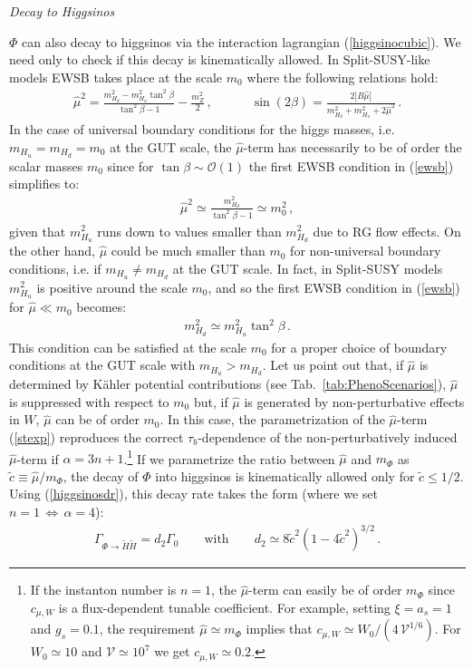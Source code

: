 \documentclass[12pt,a4paper]{book}
\newcommand\vo{{\mathcal{V}}}
\begin{document}
\textit{Decay to Higgsinos}

$\Phi$ can also decay to higgsinos via the interaction lagrangian (\ref{higgsinocubic}). We need only to check if this decay is kinematically allowed. In Split-SUSY-like models EWSB takes place at the scale $m_0$ where the following relations hold:
\begin{align}
\hat\mu^2 = \frac{m_{H_d}^2 - m_{H_u}^2 \tan^2 \beta}{\tan^2 \beta - 1} - \frac{m_Z^2}{2}\,, \qquad \quad \sin\left(2 \beta\right) = \frac{2 |B \hat\mu|}{m_{H_d}^2 + m_{H_u}^2 + 2 \hat\mu^2}\,.
\label{ewsb}
\end{align}
In the case of universal boundary conditions for the higgs masses, i.e. $m_{H_u}=m_{H_d}=m_0$ at the GUT scale, the $\hat\mu$-term has necessarily to be of order the scalar masses $m_0$ since for $\tan \beta \sim \mathcal{O}\left(1\right)$ the first EWSB condition in (\ref{ewsb}) simplifies to:
\begin{align}
\hat\mu^2 \simeq \frac{m_{H_d}^2}{\tan^2 \beta - 1} \simeq m_0^2 \,,
\label{ewsb2}
\end{align}
given that $m_{H_u}^2$ runs down to values smaller than $m_{H_d}^2$ due to RG flow effects. On the other hand, $\hat\mu$ could be much smaller than $m_0$ for non-universal boundary conditions, i.e. if $m_{H_u} \neq m_{H_d}$ at the GUT scale. In fact, in Split-SUSY models $m_{H_u}^2$ is positive around the scale $m_0$, and so the first EWSB condition in (\ref{ewsb}) for $\hat\mu \ll m_0$ becomes:
\begin{align}
m_{H_d}^2 \simeq m_{H_u}^2 \tan^2 \beta \,.
\end{align}
This condition can be satisfied at the scale $m_0$ for a proper choice of boundary conditions at the GUT scale with $m_{H_u}>m_{H_d}$. Let us point out that, if $\hat\mu$ is determined by K\"ahler potential contributions (see Tab.~\ref{tab:PhenoScenarios}), $\hat\mu$ is suppressed with respect to $m_0$ but, if $\hat\mu$ is generated by non-perturbative effects in $W$, $\hat\mu$ can be of order $m_0$. In this case, the parametrization of the $\hat\mu$-term (\ref{stexp}) reproduces the correct $\tau_b$-dependence of the non-perturbatively induced $\hat\mu$-term if $\alpha = 3 n + 1$.\footnote{If the instanton number is $n = 1$, the $\hat\mu$-term can easily be of order $m_\Phi$ since $c_{\mu,W}$ is a flux-dependent tunable coefficient. For example, setting $\xi = a_s = 1$ and $g_s = 0.1$, the requirement $\hat{\mu} \simeq m_\Phi$ implies that $c_{\mu,W} \simeq W_0/(4\,\vo^{1/6})$. For $W_0 \simeq 10$ and $\vo \simeq 10^7$ we get $c_{\mu,W} \simeq 0.2$.} If we parametrize the ratio between $\hat\mu$ and $m_{\Phi}$ as $\tilde{c} \equiv \hat\mu/m_\Phi$, the decay of $\Phi$ into higgsinos is kinematically allowed only for $\tilde{c} \leq 1/2$. Using (\ref{higgsinosdr}), this decay rate takes the form (where we set $n = 1\,\Leftrightarrow\,\alpha = 4$):
\begin{align}
\Gamma_{\Phi \rightarrow \tilde{H} \tilde{H}} = d_2 \Gamma_0 \qquad\text{with}\qquad d_2 \simeq 8 \tilde{c}^2 \left(1 - 4 \tilde{c}^2\right)^{3/2}\,.
\label{higgsinogamma}
\end{align}
\end{document}
